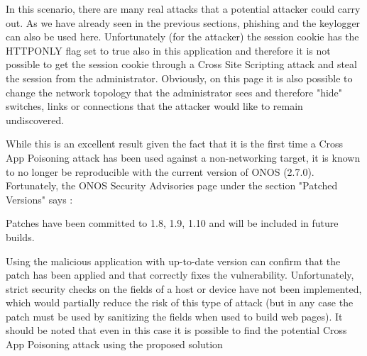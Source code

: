 In this scenario, there are many real attacks that a potential attacker could carry out. As we have already seen in the previous sections, phishing and the keylogger can also be used here. Unfortunately (for the attacker) the session cookie has the HTTPONLY flag set to true also in this application and therefore it is not possible to get the session cookie through a Cross Site Scripting attack and steal the session from the administrator. Obviously, on this page it is also possible to change the network topology that the administrator sees and therefore "hide" switches, links or connections that the attacker would like to remain undiscovered.
\medskip

While this is an excellent result given the fact that it is the first time a Cross App Poisoning attack has been used against a non-networking target, it is known to no longer be reproducible with the current version of ONOS (2.7.0). Fortunately, the ONOS Security Advisories page under the section "Patched Versions" says \cite{sec-adv-onos}:
\begin{quoting}[font=itshape, begintext={"}, endtext={"}]
Patches have been committed to 1.8, 1.9, 1.10 and will be included in future builds.
\end{quoting}

Using the malicious application with up-to-date version can confirm that the patch has been applied and that correctly fixes the vulnerability. Unfortunately, strict security checks on the fields of a host or device have not been implemented, which would partially reduce the risk of this type of attack (but in any case the patch must be used by sanitizing the fields when used to build web pages). It should be noted that even in this case it is possible to find the potential Cross App Poisoning attack using the proposed solution

\clearpage